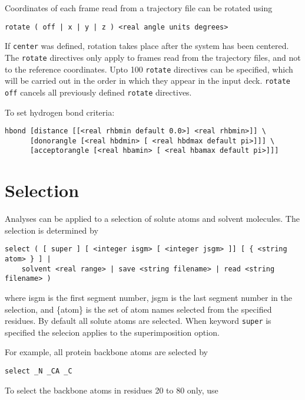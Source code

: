 Coordinates of each frame read from a trajectory file can be 
rotated using

\begin{verbatim}
rotate ( off | x | y | z ) <real angle units degrees>
\end{verbatim}

If \verb+center+ was defined, rotation takes place after
the system has been centered. The \verb+rotate+ directives
only apply to frames read from the trajectory files, and not
to the reference coordinates. Upto 100 \verb+rotate+ directives
can be specified, which will be carried out in the order in which
they appear in the input deck. \verb+rotate off+ cancels all
previously defined \verb+rotate+ directives.

To set hydrogen bond criteria:

\begin{verbatim}
hbond [distance [[<real rhbmin default 0.0>] <real rhbmin>]] \
      [donorangle [<real hbdmin> [ <real hbdmax default pi>]]] \
      [acceptorangle [<real hbamin> [ <real hbamax default pi>]]]
\end{verbatim}

\section{Selection}

Analyses can be applied to a selection of solute atoms and solvent molecules. 
The selection is determined by

\begin{verbatim}
select ( [ super ] [ <integer isgm> [ <integer jsgm> ]] [ { <string atom> } ] |
	solvent <real range> | save <string filename> | read <string filename> )
\end{verbatim}

where {\rm isgm} is the first segment number, {\rm jsgm} is the last 
segment number in the selection, and {\rm \{atom\}} is the set of atom
names selected from the specified residues. By default all solute
atoms are selected. When keyword \verb+super+ is specified the selecion
applies to the superimposition option.

\par
For example, all protein backbone atoms are selected by

\begin{verbatim}
select _N _CA _C
\end{verbatim}

To select the backbone atoms in residues 20 to 80 only, use

